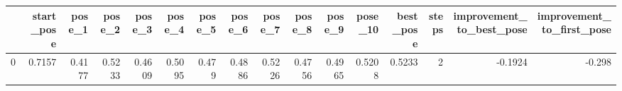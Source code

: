 \begin{tabular}{lrrrrrrrrrrrrrrr}
\toprule
{} &  start\_pose &  pose\_1 &  pose\_2 &  pose\_3 &  pose\_4 &  pose\_5 &  pose\_6 &  pose\_7 &  pose\_8 &  pose\_9 &  pose\_10 &  best\_pose &  steps &  improvement\_to\_best\_pose &  improvement\_to\_first\_pose \\
\midrule
0 &      0.7157 &  0.4177 &  0.5233 &  0.4609 &  0.5095 &   0.479 &  0.4886 &  0.5226 &  0.4756 &  0.4965 &   0.5208 &     0.5233 &      2 &                   -0.1924 &                     -0.298 \\
\bottomrule
\end{tabular}
